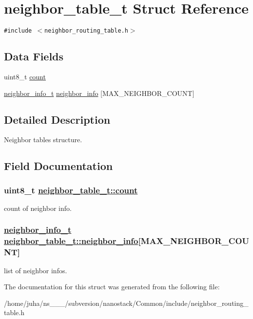 \hypertarget{structneighbor__table__t}{
\section{neighbor\_\-table\_\-t Struct Reference}
\label{structneighbor__table__t}
}
{\tt \#include $<$neighbor\_\-routing\_\-table.h$>$}

\subsection*{Data Fields}
\begin{CompactItemize}
\item 
uint8\_\-t \hyperlink{structneighbor__table__t_df94b2319ff72b7c0a8d51896484c86e}{count}
\item 
\hyperlink{structneighbor__info__t}{neighbor\_\-info\_\-t} \hyperlink{structneighbor__table__t_e30e42768188549dd78db7e22b26e702}{neighbor\_\-info} \mbox{[}MAX\_\-NEIGHBOR\_\-COUNT\mbox{]}
\end{CompactItemize}


\subsection{Detailed Description}
Neighbor tables structure. 



\subsection{Field Documentation}
\hypertarget{structneighbor__table__t_df94b2319ff72b7c0a8d51896484c86e}{
\subsubsection[count]{\setlength{\rightskip}{0pt plus 5cm}uint8\_\-t \hyperlink{structneighbor__table__t_df94b2319ff72b7c0a8d51896484c86e}{neighbor\_\-table\_\-t::count}}}
\label{structneighbor__table__t_df94b2319ff72b7c0a8d51896484c86e}


count of neighbor info. \hypertarget{structneighbor__table__t_e30e42768188549dd78db7e22b26e702}{
\subsubsection[neighbor\_\-info]{\setlength{\rightskip}{0pt plus 5cm}\hyperlink{structneighbor__info__t}{neighbor\_\-info\_\-t} \hyperlink{structneighbor__table__t_e30e42768188549dd78db7e22b26e702}{neighbor\_\-table\_\-t::neighbor\_\-info}\mbox{[}MAX\_\-NEIGHBOR\_\-COUNT\mbox{]}}}
\label{structneighbor__table__t_e30e42768188549dd78db7e22b26e702}


list of neighbor infos. 

The documentation for this struct was generated from the following file:\begin{CompactItemize}
\item 
/home/juha/ns\_\_\_/subversion/nanostack/Common/include/neighbor\_\-routing\_\-table.h\end{CompactItemize}
